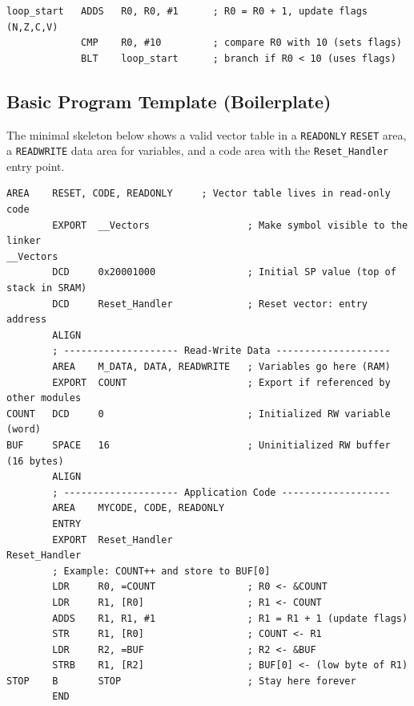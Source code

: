 \begin{lstlisting}[caption={Instruction format example}]
loop_start   ADDS   R0, R0, #1      ; R0 = R0 + 1, update flags (N,Z,C,V)
             CMP    R0, #10         ; compare R0 with 10 (sets flags)
             BLT    loop_start      ; branch if R0 < 10 (uses flags)
\end{lstlisting}




\newpage
\subsection{Basic Program Template (Boilerplate)}

The minimal skeleton below shows a valid vector table in a \texttt{READONLY} \texttt{RESET} area, a \texttt{READWRITE} data area for variables, and a code area with the \texttt{Reset\_Handler} entry point.

\begin{lstlisting}[caption={Cortex-M4 boilerplate with READWRITE data}]
        AREA    RESET, CODE, READONLY     ; Vector table lives in read-only code
        EXPORT  __Vectors                 ; Make symbol visible to the linker
__Vectors
        DCD     0x20001000                ; Initial SP value (top of stack in SRAM)
        DCD     Reset_Handler             ; Reset vector: entry address
        ALIGN        
        ; -------------------- Read-Write Data --------------------
        AREA    M_DATA, DATA, READWRITE   ; Variables go here (RAM)
        EXPORT  COUNT                     ; Export if referenced by other modules
COUNT   DCD     0                         ; Initialized RW variable (word)
BUF     SPACE   16                        ; Uninitialized RW buffer (16 bytes)
        ALIGN        
        ; -------------------- Application Code -------------------
        AREA    MYCODE, CODE, READONLY
        ENTRY
        EXPORT  Reset_Handler
Reset_Handler
        ; Example: COUNT++ and store to BUF[0]
        LDR     R0, =COUNT                ; R0 <- &COUNT
        LDR     R1, [R0]                  ; R1 <- COUNT
        ADDS    R1, R1, #1                ; R1 = R1 + 1 (update flags)
        STR     R1, [R0]                  ; COUNT <- R1        
        LDR     R2, =BUF                  ; R2 <- &BUF
        STRB    R1, [R2]                  ; BUF[0] <- (low byte of R1)
STOP    B       STOP                      ; Stay here forever
        END
\end{lstlisting}


